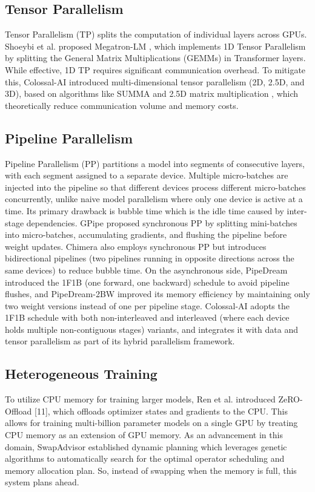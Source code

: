 \documentclass[conference]{IEEEtran}
\begin{document}
\subsection{Tensor Parallelism} Tensor Parallelism (TP) splits the computation of individual layers across GPUs. Shoeybi et al. proposed Megatron-LM \cite{DBLP:journals/corr/abs-1909-08053}, which implements 1D Tensor Parallelism by splitting the General Matrix Multiplications (GEMMs) in Transformer layers. While effective, 1D TP requires significant communication overhead. To mitigate this, Colossal-AI \cite{10.1145/3605573.3605613} introduced multi-dimensional tensor parallelism (2D, 2.5D, and 3D), based on algorithms like SUMMA \cite{vandeGeijn1995summa} and 2.5D matrix multiplication \cite{10.1007/978-3-642-23397-5_10}, which theoretically reduce communication volume and memory costs.

\subsection{Pipeline Parallelism} Pipeline Parallelism (PP) partitions a model into segments of consecutive layers, with each segment assigned to a separate device. Multiple micro-batches are injected into the pipeline so that different devices process different micro-batches concurrently, unlike naive model parallelism where only one device is active at a time. Its primary drawback is bubble time which is the idle time caused by inter-stage dependencies. GPipe \cite{DBLP:journals/corr/abs-1811-06965} proposed synchronous PP by splitting mini-batches into micro-batches, accumulating gradients, and flushing the pipeline before weight updates. Chimera \cite{li2021chimera} also employs synchronous PP but introduces bidirectional pipelines (two pipelines running in opposite directions across the same devices) to reduce bubble time. On the asynchronous side, PipeDream \cite{10.1145/3341301.3359646} introduced the 1F1B (one forward, one backward) schedule to avoid pipeline flushes, and PipeDream-2BW \cite{narayanan2021memory} improved its memory efficiency by maintaining only two weight versions instead of one per pipeline stage. Colossal-AI \cite{10.1145/3605573.3605613} adopts the 1F1B schedule with both non-interleaved and interleaved (where each device holds multiple non-contiguous stages) variants, and integrates it with data and tensor parallelism as part of its hybrid parallelism framework.

\subsection{Heterogeneous Training} To utilize CPU memory for training larger models, Ren et al. introduced ZeRO-Offload [11], which offloads optimizer states and gradients to the CPU. This allows for training multi-billion parameter models on a single GPU by treating CPU memory as an extension of GPU memory. As an advancement in this domain, SwapAdvisor \cite{huang2020swapadvisor} established dynamic planning which leverages genetic algorithms to automatically search for the optimal operator scheduling and memory allocation plan. So, instead of swapping when the memory is full, this system plans ahead.
\end{document}
